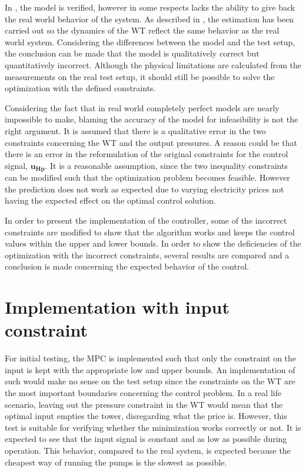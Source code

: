 In , the model is verified, however in some respects lacks the ability to give back the real world behavior of the system. As described in , the estimation has been carried out so the dynamics of the WT reflect the same behavior as the real world system. Considering the differences between the model and the test setup, the conclusion can be made that the model is qualitatively correct but quantitatively incorrect. Although the physical limitations are calculated from the measurements on the real test setup, it should still be possible to solve the optimization with the defined constraints.

 Considering the fact that in real world completely perfect models are nearly impossible to make, blaming the accuracy of the model for infeasibility is not the right argument. It is assumed that there is a qualitative error in the two constraints concerning the WT and the output pressures. A  reason could be that there is an error in the reformulation of the original constraints for the control signal, $\bm{u_{Hp}}$. It is a reasonable assumption, since the two inequality constraints can be modified such that the optimization problem becomes feasible. However the prediction does not work as expected due to varying electricity prices not having the expected effect on the optimal control solution.

In order to present the implementation of the controller, some of the incorrect constraints are modified to show that the algorithm works and keeps the control values within the upper and lower bounds. In order to show the deficiencies of the optimization with the incorrect constraints, several results are compared and a conclusion is made concerning the expected behavior of the control. 

\section{Implementation with input constraint}
\label{input constraint}

For initial testing, the MPC is implemented such that only the constraint on the input is kept with the appropriate low and upper bounds. An implementation of such would make no sense on the test setup since the constraints on the WT are the most important boundaries concerning the control problem. In a real life scenario, leaving out the pressure constraint in the WT would mean that the optimal input empties the tower, disregarding what the price is. However, this test is suitable for verifying whether the minimization works correctly or not. It is expected to see that the input signal is constant and as low as possible during operation. This behavior, compared to the real system, is expected because the cheapest way of running the pumps is the slowest as possible. 

